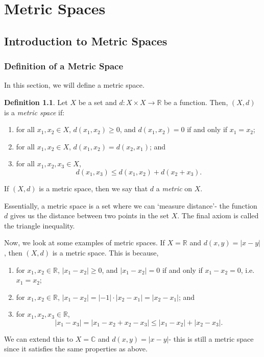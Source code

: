 \documentclass[a4paper, openany]{memoir}
\theoremstyle{definition}
\newtheorem{definition}{Definition}[section]
\theoremstyle{plain}
\begin{document}
\chapter{Metric Spaces}
\section{Introduction to Metric Spaces}
\subsection{Definition of a Metric Space}
In this section, we will define a metric space.
\begin{definition}
Let $X$ be a set and $d: X \times X \to \mathbb{R}$ be a function. Then, $(X, d)$ is a \emph{metric space} if:
\begin{enumerate}[label=\textbf{M\arabic*}.]
    \item for all $x_1, x_2 \in X$, $d(x_1, x_2) \geqslant 0$, and $d(x_1, x_2) = 0$ if and only if $x_1 = x_2$; 
    \item for all $x_1, x_2 \in X$, $d(x_1, x_2) = d(x_2, x_1)$; and
    \item for all $x_1, x_2, x_3 \in X$,
    \[d(x_1, x_3) \leqslant d(x_1, x_2) + d(x_2 + x_3).\]
\end{enumerate}
If $(X, d)$ is a metric space, then we say that $d$ a \emph{metric} on $X$.
\end{definition}
\noindent Essentially, a metric space is a set where we can `measure distance'- the function $d$ gives us the distance between two points in the set $X$. The final axiom is called the triangle inequality.

Now, we look at some examples of metric spaces. If $X = \mathbb{R}$ and $d(x, y) = |x - y|$, then $(X, d)$ is a metric space. This is because, 
\begin{enumerate}[label=\textbf{M\arabic*}.]
    \item for $x_1, x_2 \in \mathbb{R}$, $|x_1 - x_2| \geqslant 0$, and $|x_1 - x_2| = 0$ if and only if $x_1 - x_2 = 0$, i.e. $x_1 = x_2$;
    \item for $x_1, x_2 \in \mathbb{R}$, $|x_1 - x_2| = |-1| \cdot |x_2 - x_1| = |x_2 - x_1|$; and
    \item for $x_1, x_2, x_3 \in \mathbb{R}$, 
    \[|x_1 - x_3| = |x_1 - x_2 + x_2 - x_3| \leqslant |x_1 - x_2| + |x_2 - x_3|.\]
\end{enumerate}
\noindent We can extend this to $X = \mathbb{C}$ and $d(x, y) = |x - y|$- this is still a metric space since it satisfies the same properties as above.
\end{document}
